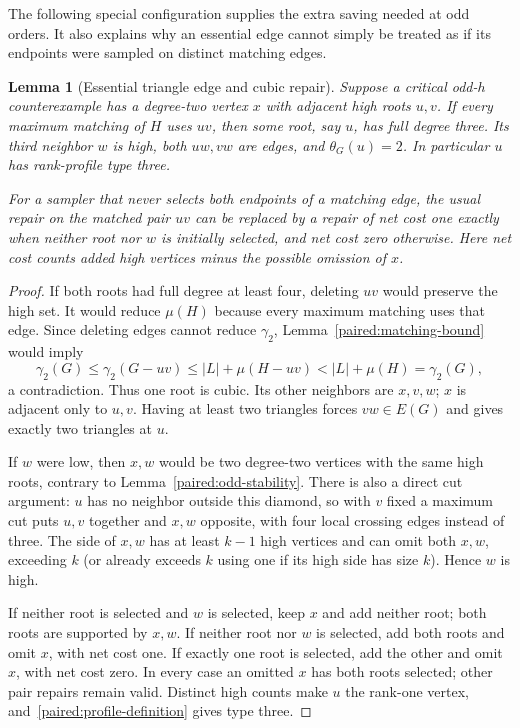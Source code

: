 \documentclass[11pt,a4paper]{article}
\newtheorem{lemma}[theorem]{Lemma}
\theoremstyle{definition}\newtheorem{definition}[theorem]{Definition}
\theoremstyle{remark}\newtheorem{remark}[theorem]{Remark}
\begin{document}
The following special configuration supplies the extra saving needed
at odd orders. It also explains why an essential edge cannot simply
be treated as if its endpoints were sampled on distinct matching edges.

\begin{lemma}[Essential triangle edge and cubic repair]\label{paired:essential}
Suppose a critical odd-$h$ counterexample has a degree-two vertex
$x$ with adjacent high roots $u,v$. If every maximum matching of
$H$ uses $uv$, then some root, say $u$, has full degree three. Its
third neighbor $w$ is high, both $uw,vw$ are edges, and
$\theta_G(u)=2$. In particular $u$ has rank-profile type three.

For a sampler that never selects both endpoints of a matching edge,
the usual repair on the matched pair $uv$ can be replaced by a
repair of net cost one exactly when neither root nor $w$ is initially
selected, and net cost zero otherwise. Here net cost counts added
high vertices minus the possible omission of $x$.
\end{lemma}
\begin{proof}
If both roots had full degree at least four, deleting $uv$ would
preserve the high set. It would reduce $\mu(H)$ because every
maximum matching uses that edge. Since deleting edges cannot reduce
$\gamma_2$, Lemma~\ref{paired:matching-bound} would imply
\[
 \gamma_2(G)\le\gamma_2(G-uv)
 \le |L|+\mu(H-uv)<|L|+\mu(H)=\gamma_2(G),
\]
a contradiction. Thus one root is cubic. Its other neighbors are
$x,v,w$; $x$ is adjacent only to $u,v$. Having at least two triangles
forces $vw\in E(G)$ and gives exactly two triangles at $u$.

If $w$ were low, then $x,w$ would be two degree-two vertices with
the same high roots, contrary to Lemma~\ref{paired:odd-stability}.
There is also a direct cut argument: $u$ has no neighbor outside
this diamond, so with $v$ fixed a maximum cut puts $u,v$ together
and $x,w$ opposite, with four local crossing edges instead of three.
The side of $x,w$ has at least $k-1$ high vertices and can omit
both $x,w$, exceeding $k$ (or already exceeds $k$ using one if its
high side has size $k$). Hence $w$ is high.

If neither root is selected and $w$ is selected, keep $x$ and add
neither root; both roots are supported by $x,w$. If neither root
nor $w$ is selected, add both roots and omit $x$, with net cost one.
If exactly one root is selected, add the other and omit $x$, with
net cost zero. In every case an omitted $x$ has both roots selected;
other pair repairs remain valid. Distinct high counts make $u$ the
rank-one vertex, and~\eqref{paired:profile-definition} gives type three.
\end{proof}
\end{document}
